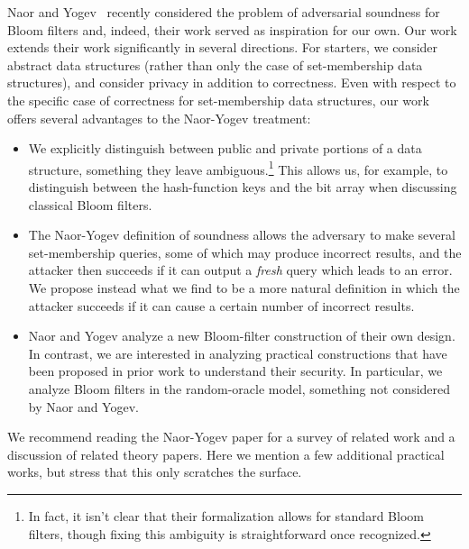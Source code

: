 Naor and Yogev~\cite{C:NaoYog15} recently considered the problem of
adversarial soundness for Bloom filters and, indeed, their work
served as inspiration for our own. Our work extends their work
significantly in several directions. For starters, we consider
abstract data structures (rather than only the case of
set-membership data structures), and consider privacy in addition to
correctness. Even with respect to the specific case of correctness
for set-membership data structures, our work offers several
advantages to the Naor-Yogev treatment:
\begin{itemize}
\item We explicitly distinguish between public and private
    portions of a data structure, something they leave
    ambiguous.\footnote{In fact, it isn't clear that their
formalization allows for standard Bloom filters, though fixing
    this ambiguity is straightforward once recognized.} This
    allows us, for example, to distinguish between the
    hash-function keys and the bit array when discussing
    classical Bloom filters.
\item The Naor-Yogev definition of soundness allows the
    adversary to make several set-membership queries, some of
    which may produce incorrect results, and the attacker then
    succeeds if it can output a \emph{fresh} query which leads
    to an error. We propose instead what we find to be a more
    natural definition in which the attacker succeeds if it can
    cause a certain number of incorrect results.
\item Naor and Yogev analyze a new Bloom-filter construction of
    their own design. In contrast, we are interested in
    analyzing practical constructions that have been proposed in
    prior work to understand their security. In particular, we
    analyze Bloom filters in the random-oracle model, something
    not considered by Naor and Yogev.
\end{itemize}



We recommend reading the Naor-Yogev paper for a survey of related
work and a discussion of related theory papers. Here we mention a
few additional practical works, but stress that this only scratches
the surface.

